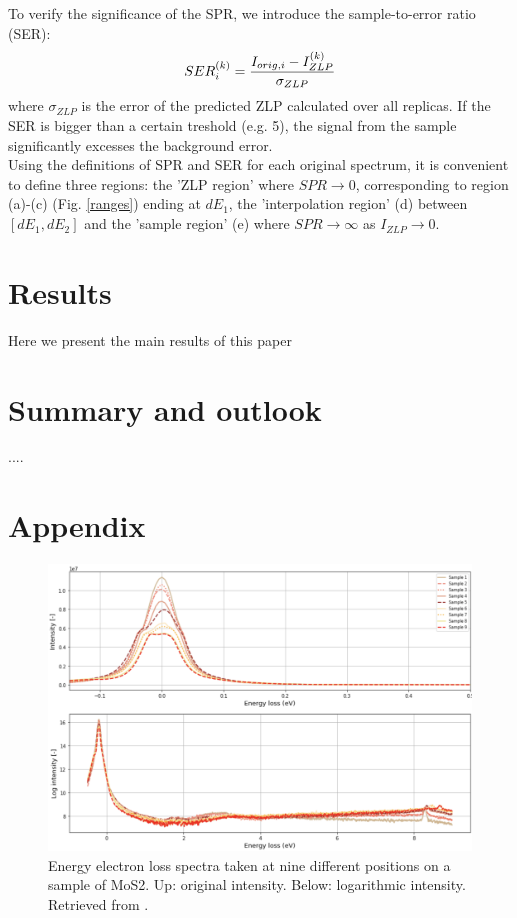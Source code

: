 \documentclass[11pt,a4paper]{article}
\def\frac#1#2{{{#1}\over {#2}}}
\numberwithin{equation}{section}
\numberwithin{figure}{section}
\numberwithin{table}{section}
\begin{document}
To verify the significance of the SPR, we introduce the sample-to-error ratio (SER):
\begin{equation}
    SER_{i}^{(k)} = \frac{I_{orig, i} - I_{ZLP}^{(k)}}{\sigma_{ZLP}}
\end{equation}
where $\sigma_{ZLP}$ is the error of the predicted ZLP calculated over all replicas. 
If the SER is bigger than a certain treshold (e.g. 5), the signal from the sample significantly excesses the background error. \\
Using the definitions of SPR and SER for each original spectrum, it is convenient to define three regions: the 'ZLP region' where $SPR \rightarrow0$, corresponding to region (a)-(c) (Fig. \ref{ranges}) ending at $dE_1$, the 'interpolation region' (d) between $[dE_1, dE_2]$ and the 'sample region' (e) where $SPR\rightarrow\infty$ as $I_{ZLP}\rightarrow0$.


\section{Results}
Here we present the main results of this paper

\section{Summary and outlook}
....

\section{Appendix}


\begin{figure}[H]
    \centering
    \includegraphics[width=130mm]{plots/spectrum.png}
    \caption{Energy electron loss spectra taken at nine different positions on a sample of MoS2. Up: original intensity. Below: logarithmic intensity. Retrieved from \cite{soniamos2}. }
    \label{spectra}
\end{figure}
\end{document}
